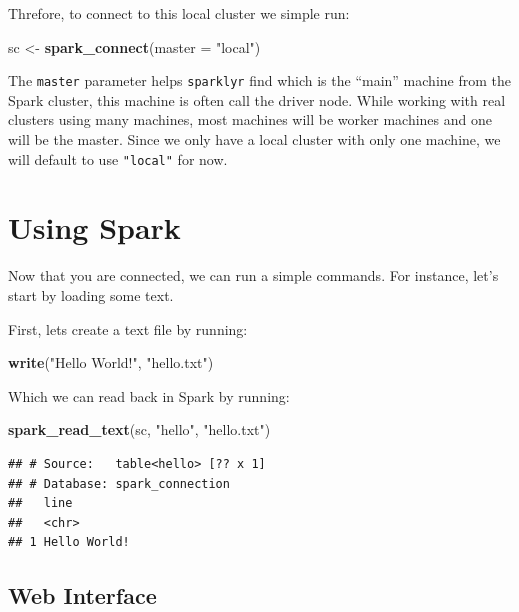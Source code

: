 \documentclass[]{book}
\newenvironment{Shaded}{\begin{snugshade}}{\end{snugshade}}
\newcommand{\DataTypeTok}[1]{\textcolor[rgb]{0.13,0.29,0.53}{#1}}
\newcommand{\KeywordTok}[1]{\textcolor[rgb]{0.13,0.29,0.53}{\textbf{#1}}}
\newcommand{\NormalTok}[1]{#1}
\newcommand{\StringTok}[1]{\textcolor[rgb]{0.31,0.60,0.02}{#1}}
\theoremstyle{definition}
\theoremstyle{definition}
\theoremstyle{definition}
\theoremstyle{remark}
\begin{document}
Threfore, to connect to this local cluster we simple run:

\begin{Shaded}
\begin{Highlighting}[]
\NormalTok{sc <-}\StringTok{ }\KeywordTok{spark_connect}\NormalTok{(}\DataTypeTok{master =} \StringTok{"local"}\NormalTok{)}
\end{Highlighting}
\end{Shaded}

The \texttt{master} parameter helps \texttt{sparklyr} find which is the
``main'' machine from the Spark cluster, this machine is often call the
driver node. While working with real clusters using many machines, most
machines will be worker machines and one will be the master. Since we
only have a local cluster with only one machine, we will default to use
\texttt{"local"} for now.

\hypertarget{using-spark}{%
\section{Using Spark}\label{using-spark}}

Now that you are connected, we can run a simple commands. For instance,
let's start by loading some text.

First, lets create a text file by running:

\begin{Shaded}
\begin{Highlighting}[]
\KeywordTok{write}\NormalTok{(}\StringTok{"Hello World!"}\NormalTok{, }\StringTok{"hello.txt"}\NormalTok{)}
\end{Highlighting}
\end{Shaded}

Which we can read back in Spark by running:

\begin{Shaded}
\begin{Highlighting}[]
\KeywordTok{spark_read_text}\NormalTok{(sc, }\StringTok{"hello"}\NormalTok{, }\StringTok{"hello.txt"}\NormalTok{)}
\end{Highlighting}
\end{Shaded}

\begin{verbatim}
## # Source:   table<hello> [?? x 1]
## # Database: spark_connection
##   line        
##   <chr>       
## 1 Hello World!
\end{verbatim}

\hypertarget{spark-web-interface}{%
\subsection{Web Interface}\label{spark-web-interface}}
\end{document}
